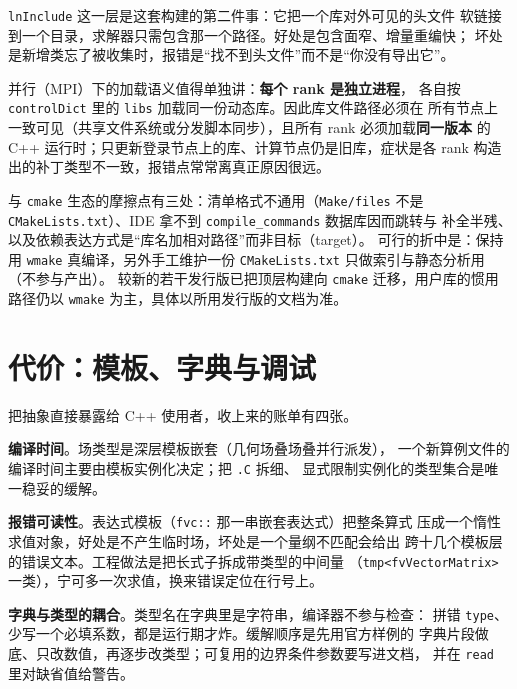 \documentclass[12pt,a4paper,fontset=fandol]{ctexbook}
\newcommand{\Tp}[1]{\texttt{#1}}
\newcommand{\Lang}[1]{\textsf{#1}}
\newcommand{\CPP}{\Lang{C++}}
\begin{document}
\Tp{lnInclude} 这一层是这套构建的第二件事：它把一个库对外可见的头文件
软链接到一个目录，求解器只需包含那一个路径。好处是包含面窄、增量重编快；
坏处是新增类忘了被收集时，报错是``找不到头文件''而不是``你没有导出它''。

并行（MPI）下的加载语义值得单独讲：\textbf{每个 rank 是独立进程}，
各自按 \Tp{controlDict} 里的 \Tp{libs} 加载同一份动态库。因此库文件路径必须在
所有节点上一致可见（共享文件系统或分发脚本同步），且所有 rank 必须加载\textbf{同一版本}
的 \CPP{} 运行时；只更新登录节点上的库、计算节点仍是旧库，症状是各 rank
构造出的补丁类型不一致，报错点常常离真正原因很远。

与 \Tp{cmake} 生态的摩擦点有三处：清单格式不通用（\Tp{Make/files} 不是
\Tp{CMakeLists.txt}）、IDE 拿不到 \Tp{compile\_commands} 数据库因而跳转与
补全半残、以及依赖表达方式是``库名加相对路径''而非目标（target）。
可行的折中是：保持用 \Tp{wmake} 真编译，另外手工维护一份
\Tp{CMakeLists.txt} 只做索引与静态分析用（不参与产出）。
较新的若干发行版已把顶层构建向 \Tp{cmake} 迁移，用户库的惯用路径仍以
\Tp{wmake} 为主，具体以所用发行版的文档为准。

\section{代价：模板、字典与调试}
\label{sec:ch06-cost}

把抽象直接暴露给 \CPP{} 使用者，收上来的账单有四张。

\textbf{编译时间}。场类型是深层模板嵌套（几何场叠场叠并行派发），
一个新算例文件的编译时间主要由模板实例化决定；把 \Tp{.C} 拆细、
显式限制实例化的类型集合是唯一稳妥的缓解。

\textbf{报错可读性}。表达式模板（\Tp{fvc::} 那一串嵌套表达式）把整条算式
压成一个惰性求值对象，好处是不产生临时场，坏处是一个量纲不匹配会给出
跨十几个模板层的错误文本。工程做法是把长式子拆成带类型的中间量
（\Tp{tmp<fvVectorMatrix>} 一类），宁可多一次求值，换来错误定位在行号上。

\textbf{字典与类型的耦合}。类型名在字典里是字符串，编译器不参与检查：
拼错 \Tp{type}、少写一个必填系数，都是运行期才炸。缓解顺序是先用官方样例的
字典片段做底、只改数值，再逐步改类型；可复用的边界条件参数要写进文档，
并在 \Tp{read} 里对缺省值给警告。
\end{document}
